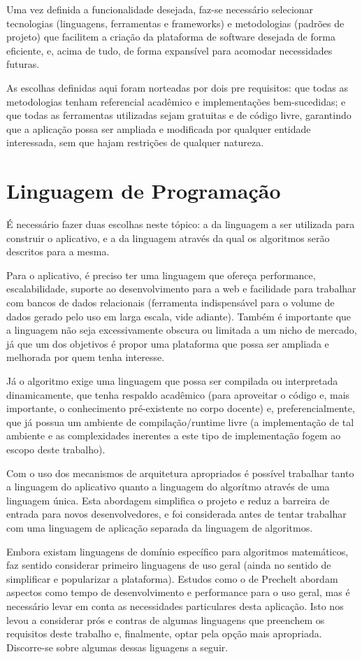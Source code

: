 \documentclass{abnt}
\begin{document}
Uma vez definida a funcionalidade desejada, faz-se necessário selecionar tecnologias (linguagens, ferramentas e frameworks) e metodologias (padrões de projeto) que facilitem a criação da plataforma de software desejada de forma eficiente, e, acima de tudo, de forma expansível para acomodar necessidades futuras.

	As escolhas definidas aqui foram norteadas por dois pre requisitos: que todas as metodologias tenham referencial acadêmico e implementações bem-sucedidas; e que todas as ferramentas utilizadas sejam gratuitas e de código livre, garantindo que a aplicação  possa ser ampliada e modificada por qualquer entidade interessada, sem que hajam restrições de qualquer natureza.
\section{Linguagem de Programação}
É necessário fazer duas escolhas neste tópico: a da linguagem a ser utilizada para construir o aplicativo, e a da linguagem através da qual os algoritmos serão descritos para a mesma.

Para o aplicativo, é preciso ter uma linguagem que ofereça performance, escalabilidade, suporte ao desenvolvimento para a web e facilidade para trabalhar com bancos de dados relacionais (ferramenta indispensável para o volume de dados gerado pelo uso em larga escala, vide adiante). Também é importante que a linguagem não seja excessivamente obscura ou limitada a um nicho de mercado, já que um dos objetivos é propor uma plataforma que possa ser ampliada e melhorada por quem tenha interesse.


	Já o algoritmo exige uma linguagem que possa ser compilada ou interpretada dinamicamente, que tenha respaldo acadêmico (para aproveitar o código e, mais importante, o conhecimento pré-existente no corpo docente) e, preferencialmente, que já possua um ambiente de compilação/runtime livre (a implementação de tal ambiente e as complexidades inerentes a este tipo de implementação fogem ao escopo deste trabalho). 

	Com o uso dos mecanismos de arquitetura apropriados é possível trabalhar tanto a linguagem do aplicativo quanto a linguagem do algorítmo  através de uma linguagem única. Esta abordagem simplifica o projeto e reduz a barreira de entrada para novos desenvolvedores, e foi considerada antes de tentar trabalhar com uma linguagem de aplicação separada da linguagem de algoritmos.

	Embora existam linguagens de domínio específico para algoritmos matemáticos, faz sentido considerar primeiro linguagens de uso geral (ainda no sentido de simplificar e popularizar a plataforma). Estudos como o de Prechelt\cite{Prechelt} abordam aspectos como tempo de desenvolvimento e performance para o uso geral, mas é necessário levar em conta as necessidades particulares desta aplicação. Isto nos levou a considerar prós e contras de algumas linguagens que preenchem os requisitos deste trabalho e, finalmente, optar pela opção mais apropriada. Discorre-se sobre algumas dessas liguagens a seguir.
\end{document}
